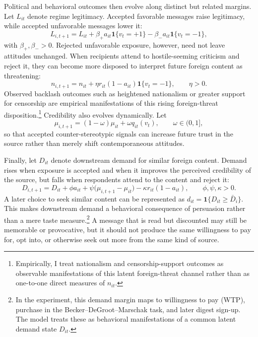 \documentclass[12pt,american]{article}
\begin{document}
		Political and behavioral outcomes then evolve along distinct but related margins. Let \(L_{it}\) denote regime legitimacy. Accepted favorable messages raise legitimacy, while accepted unfavorable messages lower it:
	\[
	L_{i,t+1}=L_{it}+\beta_{+}a_{it}\mathbf{1}\{v_t=+1\}-\beta_{-}a_{it}\mathbf{1}\{v_t=-1\},
	\]
		with \(\beta_{+},\beta_{-}>0\). Rejected unfavorable exposure, however, need not leave attitudes unchanged. When recipients attend to hostile-seeming criticism and reject it, they can become more disposed to interpret future foreign content as threatening:
	\[
	n_{i,t+1}=n_{it}+\eta r_{it}(1-a_{it})\mathbf{1}\{v_t=-1\}, \qquad \eta>0.
	\]
	Observed backlash outcomes such as heightened nationalism or greater support for censorship are empirical manifestations of this rising foreign-threat disposition.\footnote{Empirically, I treat nationalism and censorship-support outcomes as observable manifestations of this latent foreign-threat channel rather than as one-to-one direct measures of \(n_{it}\).} Credibility also evolves dynamically. Let
	\[
	\mu_{i,t+1}=(1-\omega)\mu_{it}+\omega q_{it}(v_t), \qquad \omega\in(0,1],
	\]
	so that accepted counter-stereotypic signals can increase future trust in the source rather than merely shift contemporaneous attitudes.
	
	Finally, let \(D_{it}\) denote downstream demand for similar foreign content. Demand rises when exposure is accepted and when it improves the perceived credibility of the source, but falls when respondents attend to the content and reject it:
	\[
	D_{i,t+1}=D_{it}+\phi a_{it}+\psi\big(\mu_{i,t+1}-\mu_{it}\big)-\kappa r_{it}(1-a_{it}), \qquad \phi,\psi,\kappa>0.
	\]
	A later choice to seek similar content can be represented as \(d_{it}=\mathbf{1}\{D_{it}\ge \bar D_i\}\). This makes downstream demand a behavioral consequence of persuasion rather than a mere taste measure.\footnote{In the experiment, this demand margin maps to willingness to pay (WTP), purchase in the Becker--DeGroot--Marschak task, and later digest sign-up. The model treats these as behavioral manifestations of a common latent demand state \(D_{it}\).} A message that is read but discounted may still be memorable or provocative, but it should not produce the same willingness to pay for, opt into, or otherwise seek out more from the same kind of source.
	
\end{document}
